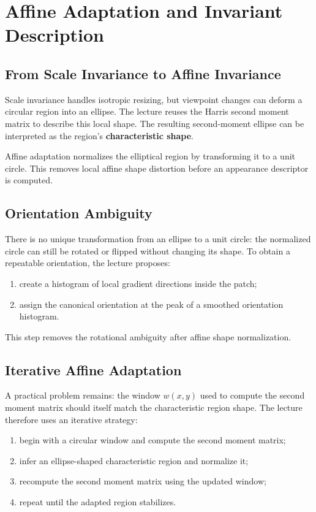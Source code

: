 \documentclass[11pt,a4paper,oneside]{report}
\begin{document}
\chapter{Affine Adaptation and Invariant Description}

\section{From Scale Invariance to Affine Invariance}

Scale invariance handles isotropic resizing, but viewpoint changes can deform a circular region into an ellipse. The lecture reuses the Harris second moment matrix to describe this local shape. The resulting second-moment ellipse can be interpreted as the region's \textbf{characteristic shape}.

Affine adaptation normalizes the elliptical region by transforming it to a unit circle. This removes local affine shape distortion before an appearance descriptor is computed.

\section{Orientation Ambiguity}

There is no unique transformation from an ellipse to a unit circle: the normalized circle can still be rotated or flipped without changing its shape. To obtain a repeatable orientation, the lecture proposes:
\begin{enumerate}
  \item create a histogram of local gradient directions inside the patch;
  \item assign the canonical orientation at the peak of a smoothed orientation histogram.
\end{enumerate}

This step removes the rotational ambiguity after affine shape normalization.

\section{Iterative Affine Adaptation}

A practical problem remains: the window $w(x,y)$ used to compute the second moment matrix should itself match the characteristic region shape. The lecture therefore uses an iterative strategy:
\begin{enumerate}
  \item begin with a circular window and compute the second moment matrix;
  \item infer an ellipse-shaped characteristic region and normalize it;
  \item recompute the second moment matrix using the updated window;
  \item repeat until the adapted region stabilizes.
\end{enumerate}
\end{document}
